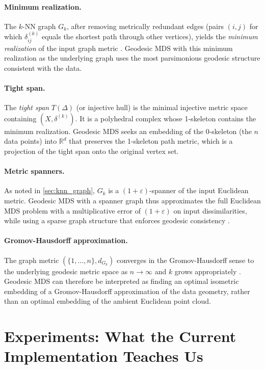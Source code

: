 \documentclass[twoside,11pt]{article}
\newcommand{\R}{\mathbb{R}}
\newcommand{\Gk}{G_k}
\begin{document}
\paragraph{Minimum realization.}
The $k$-NN graph $\Gk$, after removing metrically redundant edges
(pairs $(i,j)$ for which $\delta^{(k)}_{ij}$ equals the shortest path
through other vertices), yields the \emph{minimum realization} of the
input graph metric \citep{dress1984trees, imrich1984optimal}.
Geodesic MDS with this minimum realization as the underlying graph
uses the most parsimonious geodesic structure consistent with the data.

\paragraph{Tight span.}
The \emph{tight span} $T(\Delta)$ (or injective hull)
\citep{dress1984trees, isbell1964six} is the minimal injective metric
space containing $(X, \delta^{(k)})$.  It is a polyhedral complex whose
1-skeleton contains the minimum realization.  Geodesic MDS seeks an
embedding of the 0-skeleton (the $n$ data points) into $\R^d$ that
preserves the 1-skeleton path metric, which is a projection of the
tight span onto the original vertex set.

\paragraph{Metric spanners.}
As noted in \cref{sec:knn_graph}, $\Gk$ is a $(1+\varepsilon)$-spanner
of the input Euclidean metric.  Geodesic MDS with a spanner graph thus
approximates the full Euclidean MDS problem with a multiplicative error
of $(1+\varepsilon)$ on input dissimilarities, while using a sparse graph
structure that enforces geodesic consistency \citep{althofer1993sparse}.

\paragraph{Gromov-Hausdorff approximation.}
The graph metric $(\{1,\ldots,n\}, d_{\Gk})$ converges in the
Gromov-Hausdorff sense to the underlying geodesic metric space as
$n \to \infty$ and $k$ grows appropriately
\citep{gromov1999metric, latschev2001riemannian, bernstein2000graph}.
Geodesic MDS can therefore be interpreted as finding an optimal isometric
embedding of a Gromov-Hausdorff approximation of the data geometry, rather
than an optimal embedding of the ambient Euclidean point cloud.

\section{Experiments: What the Current Implementation Teaches Us}
\label{sec:experiments_v4}
\end{document}
